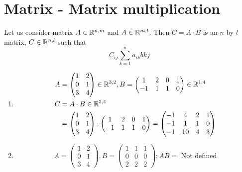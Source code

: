 \section{Matrix - Matrix multiplication}
\begin{definition}
Let us consider matrix $A\in\mathbb{R}^{n,m}$ and $A\in\mathbb{R}^{m,l}$. Then $C = A\cdot B$ is an $n$ by $l$ matrix, $C\in\mathbb{R}^{n,l}$ such that 
\[
C_{ij}\sum\limits^{n}_{k=1}a_{ik}b{kj}
\]
\end{definition}
\begin{example}
\begin{enumerate}
\item \begin{align*}
A&= \begin{pmatrix}
1 & 2\\
0 & 1\\
3 & 4
\end{pmatrix}\in\mathbb{R}^{3,2}, B = \begin{pmatrix}
1 & 2 & 0 & 1\\
-1 & 1 & 1 & 0
\end{pmatrix}\in\mathbb{R}^{1,4}\\
C &= A\cdot B\in\mathbb{R}^{3,4}\\
&= \begin{pmatrix}
1 & 2\\
0 & 1\\
3 & 4
\end{pmatrix}\cdot \begin{pmatrix}
1 & 2 & 0 & 1\\
-1 & 1 & 1 & 0
\end{pmatrix} = \begin{pmatrix}
-1 & 4 & 2 & 1\\
-1 & 1 & 1 & 0\\
-1 & 10 & 4 & 3
\end{pmatrix}
\end{align*}
\item 
\[
A = \begin{pmatrix}
1 & 2 \\ 
0 & 1\\
3 & 4
\end{pmatrix}, B = \begin{pmatrix}
1 & 1 & 1\\
0 & 0 & 0\\
2 & 2 & 2
\end{pmatrix}; AB = \text{ Not defined}
\]
\end{enumerate}
\end{example}

